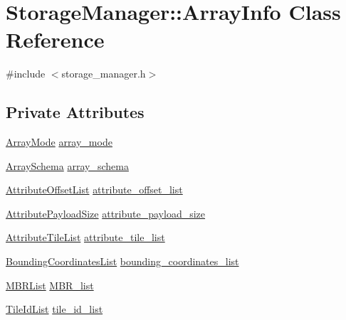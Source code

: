 \hypertarget{classStorageManager_1_1ArrayInfo}{}\section{Storage\+Manager\+:\+:Array\+Info Class Reference}
\label{classStorageManager_1_1ArrayInfo}


{\ttfamily \#include $<$storage\+\_\+manager.\+h$>$}

\subsection*{Private Attributes}
\begin{DoxyCompactItemize}
\item 
\hyperlink{classStorageManager_a283b60c689883bc7c343ffbf1de8fc3d}{Array\+Mode} \hyperlink{classStorageManager_1_1ArrayInfo_aa56b9a598dc49aee081be262b0963cb8}{array\+\_\+mode}
\item 
\hyperlink{classArraySchema}{Array\+Schema} \hyperlink{classStorageManager_1_1ArrayInfo_a60ab57f41b311d2d4a43e13b3a5f724b}{array\+\_\+schema}
\item 
\hyperlink{classStorageManager_a57b39e55d7b113ec0b7b6e42bebf89a8}{Attribute\+Offset\+List} \hyperlink{classStorageManager_1_1ArrayInfo_a3c8572cbfe484d51eaad76691df35307}{attribute\+\_\+offset\+\_\+list}
\item 
\hyperlink{classStorageManager_a9d98cda8658cd63a241ed68c2d448d7a}{Attribute\+Payload\+Size} \hyperlink{classStorageManager_1_1ArrayInfo_ac5bab01a9632352ec518a9fa8ee227f2}{attribute\+\_\+payload\+\_\+size}
\item 
\hyperlink{classStorageManager_aaeb47718d73e6784b60b10462ece1721}{Attribute\+Tile\+List} \hyperlink{classStorageManager_1_1ArrayInfo_a7591c9d182ecf561c93b85fff806b841}{attribute\+\_\+tile\+\_\+list}
\item 
\hyperlink{classStorageManager_abec326039e3ff849add9ea3f68865a48}{Bounding\+Coordinates\+List} \hyperlink{classStorageManager_1_1ArrayInfo_a2ade6b75055a6bfcf8bbfb11ca7e3cfc}{bounding\+\_\+coordinates\+\_\+list}
\item 
\hyperlink{classStorageManager_afb1d1d250088f1f133590713323b4d19}{M\+B\+R\+List} \hyperlink{classStorageManager_1_1ArrayInfo_a66111e092164f729d33231c0f0a62e77}{M\+B\+R\+\_\+list}
\item 
\hyperlink{classStorageManager_ab6ebfedc0e23ff16fb030cccdc34486b}{Tile\+Id\+List} \hyperlink{classStorageManager_1_1ArrayInfo_af1b6f3e3602d2defee5558795829d639}{tile\+\_\+id\+\_\+list}
\end{DoxyCompactItemize}


